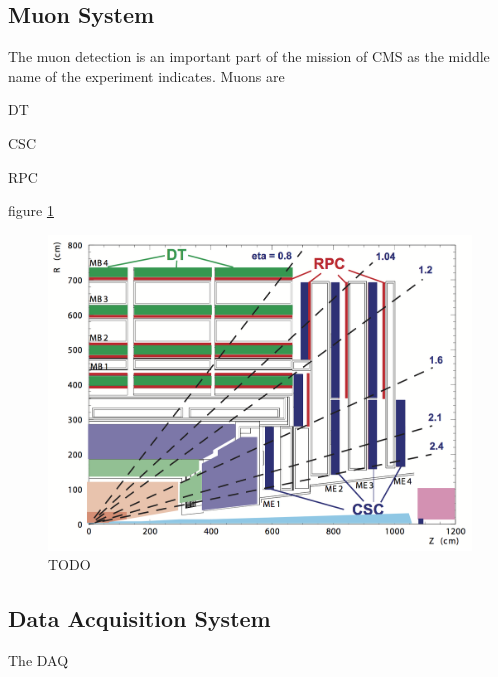 \subsection{Muon System}
\label{SUBSECTION:ExperimentalApparatus_CMS_Moun}

The muon detection is an important part of the mission of \gls{CMS} as the middle name of the experiment indicates. Muons are 

\gls{DT}

\gls{CSC}

\gls{RPC}

figure \ref{FIGURE:ExperimentalApparatus_CMS_Muon_Layout}

\begin{figure}[!htb]
  \centering
  \includegraphics{Chapter02/CMS/Images/CMS_Muon_Layout.png}
  \caption{TODO}
  \label{FIGURE:ExperimentalApparatus_CMS_Muon_Layout}
\end{figure}

\subsection{Data Acquisition System}
\label{SUBSECTION:ExperimentalApparatus_CMS_DAQ}

The \gls{DAQ}

